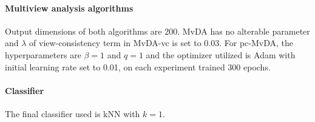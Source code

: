         \paragraph{Multiview analysis algorithms}
        Output dimensions of both algorithms are 200. MvDA has no alterable parameter and $\lambda$ of view-consistency term in MvDA-vc is set to 0.03.
        For pc-MvDA, the hyperparameters are $\beta = 1$ and $q = 1$ and the optimizer utilized is Adam with initial learning rate set to 0.01, on each experiment trained 300 epochs.

        \paragraph{Classifier}
        The final classifier used is kNN with $k = 1$.

